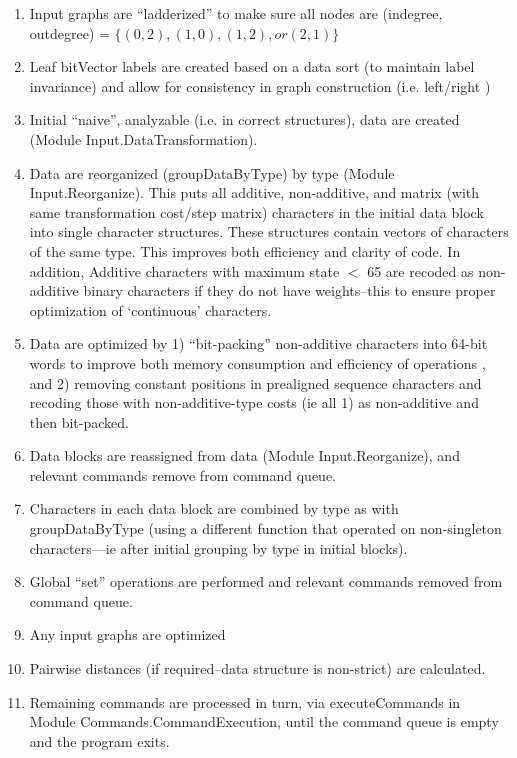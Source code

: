 \documentclass[11pt]{article}
\begin{document}
\begin{enumerate}
		\item{Input graphs are ``ladderized'' to make sure all nodes are (indegree, outdegree) = $\{(0,2), (1,0), (1,2), or (2,1)\}$}
		
		\item{Leaf bitVector labels are created based on a data sort (to maintain label invariance) and allow for consistency 
			in graph construction (i.e. left/right \cite{WashburnandWheeler2020})}
		
		\item{Initial ``naive'', analyzable (i.e. in correct structures), data are created (Module Input.DataTransformation).}
		
		
		\item{Data are reorganized (groupDataByType) by type (Module Input.Reorganize).  This puts all additive, non-additive, and matrix (with same 
			transformation cost/step matrix) characters in the initial data block into single character structures.  These structures contain vectors of 
			characters of the same type.  
			This improves both efficiency and clarity of code. In addition, Additive characters with maximum state 	$<$ 65 
			are recoded as non-additive binary characters \cite{Farris1970} if they do not have weights--this to ensure proper optimization of 
			`continuous' characters.} 
		
		\item{Data are optimized by 1) ``bit-packing'' non-additive characters into 64-bit words to improve both memory consumption
			and efficiency of operations \cite{Ronquist1998, moilanen1999, goloboff2002, WhiteandHolland2011}, and 2) removing constant positions in prealigned sequence characters and recoding those with non-additive-type costs (ie all 1) as non-additive and then bit-packed.}
		
		\item{Data blocks are reassigned from  data (Module Input.Reorganize), and relevant commands remove from command queue.}
		
		\item{Characters in each data block are combined by type as with groupDataByType (using a different function that operated on non-singleton characters---ie after initial grouping by type in initial blocks).}
		
		\item{Global ``set'' operations are performed and relevant commands
			removed from command queue.}
		
		\item{Any input graphs are optimized}
		
		\item{Pairwise distances (if required--data structure is non-strict) are calculated.}
		
		\item{Remaining commands are processed in turn, via executeCommands in Module 
			Commands.CommandExecution, until the command queue is empty
			and the program exits.}
		
	\end{enumerate} 
	
\end{document}
